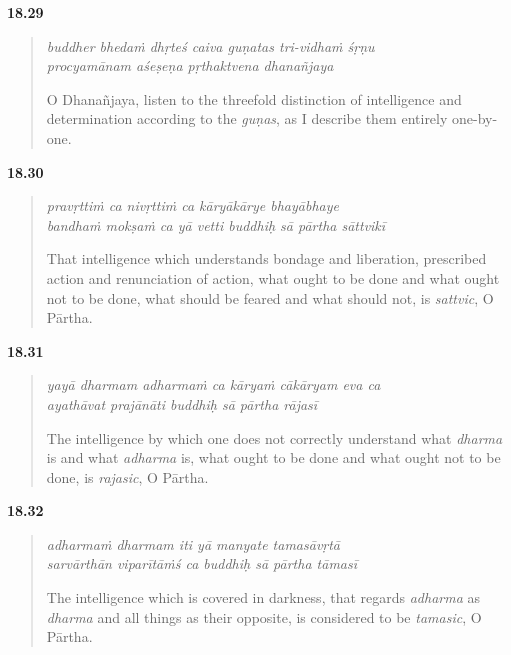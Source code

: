 \par\noindent\textbf{18.29}\par
\begin{verse}
\textit{buddher bhedaṁ dhṛteś caiva guṇatas tri-vidhaṁ śṛṇu} \\
\textit{procyamānam aśeṣeṇa pṛthaktvena dhanañjaya}

\noindent O Dhanañjaya, listen to the threefold distinction of intelligence and determination according to the \textit{guṇas}, as I describe them entirely one-by-one.
\end{verse}
\par



\par\noindent\textbf{18.30}\par
\begin{verse}
\textit{pravṛttiṁ ca nivṛttiṁ ca kāryākārye bhayābhaye} \\
\textit{bandhaṁ mokṣaṁ ca yā vetti buddhiḥ sā pārtha sāttvikī}

\noindent That intelligence which understands bondage and liberation, prescribed action and renunciation of action, what ought to be done and what ought not to be done, what should be feared and what should not, is \textit{sattvic}, O Pārtha.
\end{verse}
\par



\par\noindent\textbf{18.31}\par
\begin{verse}
\textit{yayā dharmam adharmaṁ ca kāryaṁ cākāryam eva ca} \\
\textit{ayathāvat prajānāti buddhiḥ sā pārtha rājasī}

\noindent The intelligence by which one does not correctly understand what \textit{dharma} is and what \textit{adharma} is, what ought to be done and what ought not to be done, is \textit{rajasic}, O Pārtha.
\end{verse}
\par



\par\noindent\textbf{18.32}\par
\begin{verse}
\textit{adharmaṁ dharmam iti yā manyate tamasāvṛtā} \\
\textit{sarvārthān viparītāṁś ca buddhiḥ sā pārtha tāmasī}

\noindent The intelligence which is covered in darkness, that regards \textit{adharma} as \textit{dharma} and all things as their opposite, is considered to be \textit{tamasic}, O Pārtha.
\end{verse}
\par


